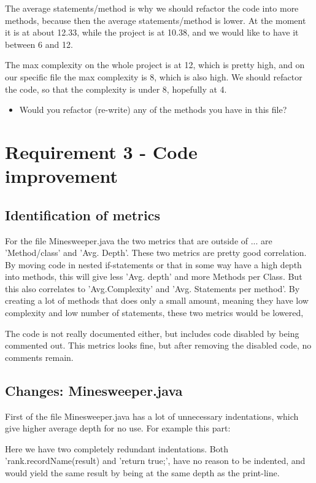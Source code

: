 \documentclass[UKenglish]{article}  %
\begin{document}
The average statements/method is why we should refactor the code into more methods, because then the average statements/method is lower. At the moment it is at about 12.33, while the project is at 10.38, and we would like to have it between 6 and 12. 

The max complexity on the whole project is at 12, which is pretty high, and on our specific file the max complexity is 8, which is also high. We should refactor the code, so that the complexity is under 8, hopefully at 4. 


\begin{itemize}
\item Would you refactor (re-write) any of the methods you have in this file?
\end{itemize}

\section{Requirement 3 - Code improvement}
\subsection{Identification of metrics}
For the file Minesweeper.java the two metrics that are outside of ... are 
'Method/class' and 'Avg. Depth'. These two metrics are pretty good correlation.
By moving code in nested if-statements or that in some way have a high depth 
into methods, this will give less 'Avg. depth' and more Methods per Class. 
But this also correlates to 'Avg.Complexity' and 'Avg. Statements per method'.
By creating a lot of methods that does only a small amount, meaning they have
low complexity and low number of statements, these two metrics would be lowered,

The code is not really documented either, but includes code disabled by being
commented out. This metrics looks fine, but after removing the disabled code,
no comments remain.

\subsection{Changes: Minesweeper.java}
First of the file Minesweeper.java has a lot of unnecessary indentations, which
give higher average depth for no use. For example this part:



Here we have two completely redundant indentations. Both 
'rank.recordName(result) and 'return true;', have no reason to be indented, and 
would yield the same result by being at the same depth as the print-line. 
\end{document}
